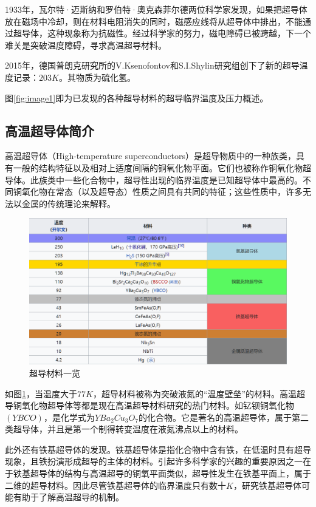 \documentclass[UTF8, twocolumn]{ctexart}
\begin{document}
    1933年，瓦尔特·迈斯纳和罗伯特·奥克森菲尔德两位科学家发现，如果把超导体放在磁场中冷却，则在材料电阻消失的同时，磁感应线将从超导体中排出，不能通过超导体，这种现象称为抗磁性。经过科学家的努力，磁电障碍已被跨越，下一个难关是突破温度障碍，寻求高温超导材料。

    2015年，德国普朗克研究所的V.Ksenofontov和S.I.Shylin研究组创下了新的超导温度记录：$203K$。其物质为硫化氢。

    图\ref{fig:image1}即为已发现的各种超导材料的超导临界温度及压力概述\cite{Ray2016}。

    \subsection{高温超导体简介}

    高温超导体（High-temperature superconductors）是超导物质中的一种族类，具有一般的结构特征以及相对上适度间隔的铜氧化物平面。它们也被称作铜氧化物超导体。此族类中一些化合物中，超导性出现的临界温度是已知超导体中最高的。不同铜氧化物在常态（以及超导态）性质之间具有共同的特征；这些性质中，许多无法以金属的传统理论来解释。

    \begin{figure}[ht]
        \centering
        \includegraphics[scale=0.7]{image/超导材料.png}
        \caption{超导材料一览}
        \label{fig:image2}
    \end{figure}

    如图\ref{fig:image2}，当温度大于$77K$，超导材料被称为突破液氮的“温度壁垒”的材料。高温超导铜氧化物超导体等都是现在高温超导材料研究的热门材料。如钇钡铜氧化物$(YBCO)$，是化学式为$YBa_2 Cu_3 O_7$的化合物。它是著名的高温超导体，属于第二类超导体，并且是第一个制得转变温度在液氮沸点以上的材料。
    
    此外还有铁基超导体的发现。铁基超导体是指化合物中含有铁，在低温时具有超导现象，且铁扮演形成超导的主体的材料。引起许多科学家的兴趣的重要原因之一在于铁基超导体的结构与高温超导的铜氧平面类似，超导性发生在铁基平面上，属于二维的超导材料。因此尽管铁基超导体的临界温度只有数十$K$，研究铁基超导体可能有助于了解高温超导的机制。
\end{document}
